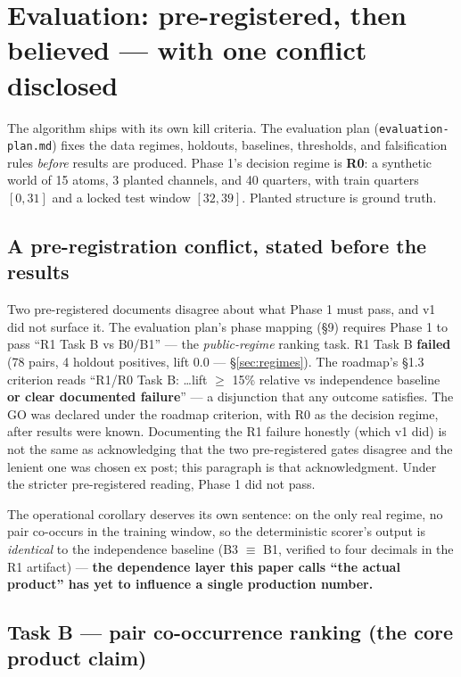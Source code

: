 \documentclass[11pt]{article}
\begin{document}
\section{Evaluation: pre-registered, then believed --- with one conflict disclosed}
\label{sec:eval}

The algorithm ships with its own kill criteria. The evaluation plan
(\texttt{evaluation-plan.md}) fixes the data regimes, holdouts, baselines,
thresholds, and falsification rules \emph{before} results are produced.
Phase 1's decision regime is \textbf{R0}: a synthetic world of 15 atoms, 3
planted channels, and 40 quarters, with train quarters $[0, 31]$ and a
locked test window $[32, 39]$. Planted structure is ground truth.

\subsection{A pre-registration conflict, stated before the results}
\label{sec:conflict}

Two pre-registered documents disagree about what Phase 1 must pass, and v1
did not surface it. The evaluation plan's phase mapping (\S9) requires Phase
1 to pass ``R1 Task B vs B0/B1'' --- the \emph{public-regime} ranking task.
R1 Task B \textbf{failed} (78 pairs, 4 holdout positives, lift 0.0 ---
\S\ref{sec:regimes}). The roadmap's \S1.3 criterion reads ``R1/R0 Task B:
\ldots lift $\ge$ 15\% relative vs independence baseline \textbf{or clear
documented failure}'' --- a disjunction that any outcome satisfies. The GO
was declared under the roadmap criterion, with R0 as the decision regime,
after results were known. Documenting the R1 failure honestly (which v1 did)
is not the same as acknowledging that the two pre-registered gates disagree
and the lenient one was chosen ex post; this paragraph is that
acknowledgment. Under the stricter pre-registered reading, Phase 1 did not
pass.

The operational corollary deserves its own sentence: on the only real
regime, no pair co-occurs in the training window, so the deterministic
scorer's output is \emph{identical} to the independence baseline
(B3 $\equiv$ B1, verified to four decimals in the R1 artifact) ---
\textbf{the dependence layer this paper calls ``the actual product'' has yet
to influence a single production number.}

\subsection{Task B --- pair co-occurrence ranking (the core product claim)}
\label{sec:taskb}
\end{document}
